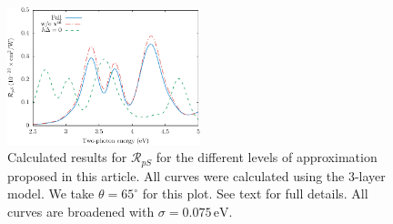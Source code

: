 \begin{figure}[H]
\centering
\includegraphics[width=0.5\textwidth]{content/figures/fig-Si1x1-Mejia_RpS_improvements}
\caption{Calculated results for $\mathcal{R}_{pS}$ for the different levels of approximation proposed in this article. All curves were calculated using the 3-layer model. We take $\theta=65^{\circ}$ for this plot. See text for full details. All curves are broadened with $\sigma=0.075\,\text{eV}$.}
\label{fig:improvements}
\end{figure}


\stopcontents[chapters]
